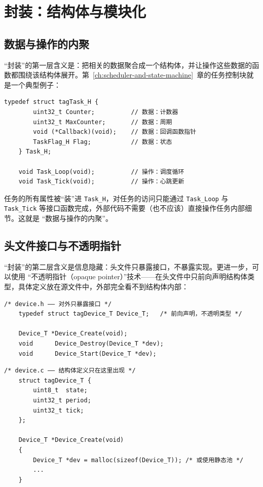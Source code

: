 \section{封装：结构体与模块化}

\subsection{数据与操作的内聚}

“封装”的第一层含义是：把相关的数据聚合成一个结构体，并让操作这些数据的函数都围绕该结构体展开。第~\ref{ch:scheduler-and-state-machine}~章的任务控制块就是一个典型例子：

\begin{lstlisting}[style=c]
	typedef struct tagTask_H {
		uint32_t Counter;          // 数据：计数器
		uint32_t MaxCounter;       // 数据：周期
		void (*Callback)(void);    // 数据：回调函数指针
		TaskFlag_H Flag;           // 数据：状态
	} Task_H;
	
	void Task_Loop(void);          // 操作：调度循环
	void Task_Tick(void);          // 操作：心跳更新
\end{lstlisting}

任务的所有属性被“装”进 \texttt{Task\_H}，对任务的访问只能通过 \texttt{Task\_Loop} 与 \texttt{Task\_Tick} 等接口函数完成，外部代码不需要（也不应该）直接操作任务内部细节。这就是 “数据与操作的内聚”。

\subsection{头文件接口与不透明指针}

“封装”的第二层含义是信息隐藏：头文件只暴露接口，不暴露实现。更进一步，可以使用 “不透明指针（opaque pointer）”技术——在头文件中只前向声明结构体类型，具体定义放在源文件中，外部完全看不到结构体内部：

\begin{lstlisting}[style=c]
	/* device.h —— 对外只暴露接口 */
	typedef struct tagDevice_T Device_T;   /* 前向声明，不透明类型 */
	
	Device_T *Device_Create(void);
	void      Device_Destroy(Device_T *dev);
	void      Device_Start(Device_T *dev);
\end{lstlisting}

\begin{lstlisting}[style=c]
	/* device.c —— 结构体定义只在这里出现 */
	struct tagDevice_T {
		uint8_t  state;
		uint32_t period;
		uint32_t tick;
	};
	
	Device_T *Device_Create(void)
	{
		Device_T *dev = malloc(sizeof(Device_T)); /* 或使用静态池 */
		...
	}
\end{lstlisting}

